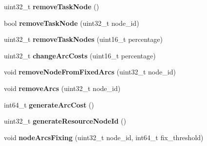 \begin{DoxyCompactItemize}
\item 
\hypertarget{classflowlessly_1_1Graph_aa1edd4831228dac2e4da8a4d9aadcb04}{uint32\-\_\-t {\bfseries remove\-Task\-Node} ()}\label{classflowlessly_1_1Graph_aa1edd4831228dac2e4da8a4d9aadcb04}

\item 
\hypertarget{classflowlessly_1_1Graph_a1faca558ebb7f1ee4c2dea2bdbb0bcda}{bool {\bfseries remove\-Task\-Node} (uint32\-\_\-t node\-\_\-id)}\label{classflowlessly_1_1Graph_a1faca558ebb7f1ee4c2dea2bdbb0bcda}

\item 
\hypertarget{classflowlessly_1_1Graph_a3cbad4f3a1533e1e988b8f1c1d3487f2}{uint32\-\_\-t {\bfseries remove\-Task\-Nodes} (uint16\-\_\-t percentage)}\label{classflowlessly_1_1Graph_a3cbad4f3a1533e1e988b8f1c1d3487f2}

\item 
\hypertarget{classflowlessly_1_1Graph_afd41486784423b8befd15cfd731de02e}{uint32\-\_\-t {\bfseries change\-Arc\-Costs} (uint16\-\_\-t percentage)}\label{classflowlessly_1_1Graph_afd41486784423b8befd15cfd731de02e}

\item 
\hypertarget{classflowlessly_1_1Graph_a4f3e5f3510914513dc7b4df518fe23d2}{void {\bfseries remove\-Node\-From\-Fixed\-Arcs} (uint32\-\_\-t node\-\_\-id)}\label{classflowlessly_1_1Graph_a4f3e5f3510914513dc7b4df518fe23d2}

\item 
\hypertarget{classflowlessly_1_1Graph_a9fccb6382a338b6edf268d62abe5f2f2}{void {\bfseries remove\-Arcs} (uint32\-\_\-t node\-\_\-id)}\label{classflowlessly_1_1Graph_a9fccb6382a338b6edf268d62abe5f2f2}

\item 
\hypertarget{classflowlessly_1_1Graph_abc9a7c307852aed252865201f27b8515}{int64\-\_\-t {\bfseries generate\-Arc\-Cost} ()}\label{classflowlessly_1_1Graph_abc9a7c307852aed252865201f27b8515}

\item 
\hypertarget{classflowlessly_1_1Graph_ac27e3f9a0c8a2b6bac354f7b5a4595e8}{uint32\-\_\-t {\bfseries generate\-Resource\-Node\-Id} ()}\label{classflowlessly_1_1Graph_ac27e3f9a0c8a2b6bac354f7b5a4595e8}

\item 
\hypertarget{classflowlessly_1_1Graph_aa31d4c0e70c3d114bd29677cd8806653}{void {\bfseries node\-Arcs\-Fixing} (uint32\-\_\-t node\-\_\-id, int64\-\_\-t fix\-\_\-threshold)}\label{classflowlessly_1_1Graph_aa31d4c0e70c3d114bd29677cd8806653}


\end{DoxyCompactItemize}
